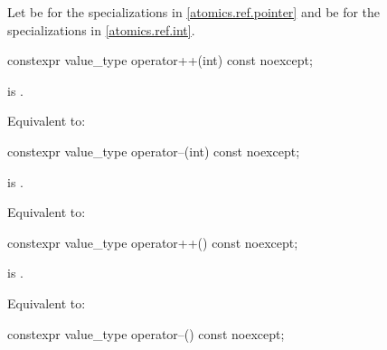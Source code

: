 \pnum
Let 
be 
for the specializations in \ref{atomics.ref.pointer} and
be 
for the specializations in \ref{atomics.ref.int}.


%
%
\begin{itemdecl}
constexpr value_type operator++(int) const noexcept;
\end{itemdecl}

\begin{itemdescr}
\pnum
\constraints
{} is .

\pnum
\effects
Equivalent to: 
\end{itemdescr}

%
%
\begin{itemdecl}
constexpr value_type operator--(int) const noexcept;
\end{itemdecl}

\begin{itemdescr}
\pnum
\constraints
{} is .

\pnum
\effects
Equivalent to: 
\end{itemdescr}

%
%
\begin{itemdecl}
constexpr value_type operator++() const noexcept;
\end{itemdecl}

\begin{itemdescr}
\pnum
\constraints
{} is .

\pnum
\effects
Equivalent to: 
\end{itemdescr}

%
%
\begin{itemdecl}
constexpr value_type operator--() const noexcept;
\end{itemdecl}

